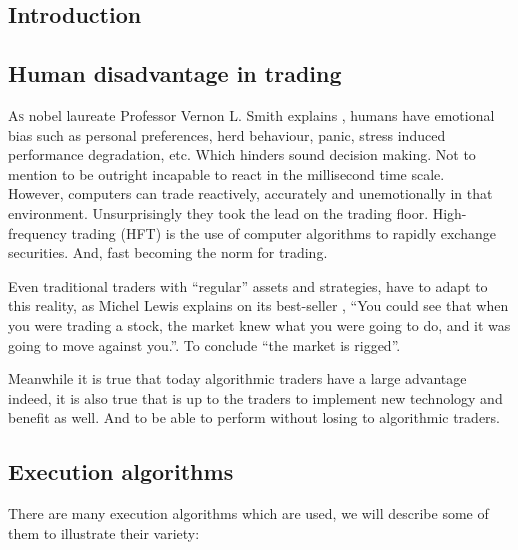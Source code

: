 \documentclass[twoside]{article}
\begin{document}
\begin{multicols}{2} %

\section{Introduction}

\subsection{Human disadvantage in trading}

\lettrine[nindent=0em,lines=3]{A}s nobel laureate Professor Vernon L. Smith explains \cite{smith2009}, humans have emotional bias such as personal preferences, herd behaviour, panic, stress induced performance degradation, etc. Which hinders sound decision making. Not to mention to be outright incapable to react in the millisecond time scale.\\

However, computers can trade reactively, accurately and unemotionally in that environment. Unsurprisingly they took the lead on the trading floor. High-frequency trading (HFT) is the use of computer algorithms to rapidly exchange securities. And, fast becoming the norm for trading.

Even traditional traders with ``regular'' assets and strategies, have to adapt to this reality, as Michel Lewis explains on its best-seller \cite{lewis2014},  “You could see that when you were trading a stock, the market knew what you were going to do, and it was going to move against you.”. To conclude ``the market is rigged''.

Meanwhile it is true that today algorithmic traders have a large advantage indeed, it is also true that is up to the traders to implement new technology and benefit as well. And to be able to perform without losing to algorithmic traders.

\subsection{Execution algorithms}

There are many execution algorithms which are used, we will describe some of them to illustrate their variety:


\end{multicols}
\end{document}
